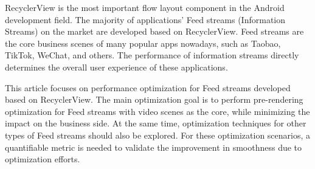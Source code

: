 RecyclerView is the most important flow layout component in the Android development field. The majority of applications' Feed streams (Information Streams) on the market are developed based on RecyclerView. Feed streams are the core business scenes of many popular apps nowadays, such as Taobao, TikTok, WeChat, and others. The performance of information streams directly determines the overall user experience of these applications.

This article focuses on performance optimization for Feed streams developed based on RecyclerView. The main optimization goal is to perform pre-rendering optimization for Feed streams with video scenes as the core, while minimizing the impact on the business side. At the same time, optimization techniques for other types of Feed streams should also be explored. For these optimization scenarios, a quantifiable metric is needed to validate the improvement in smoothness due to optimization efforts.





